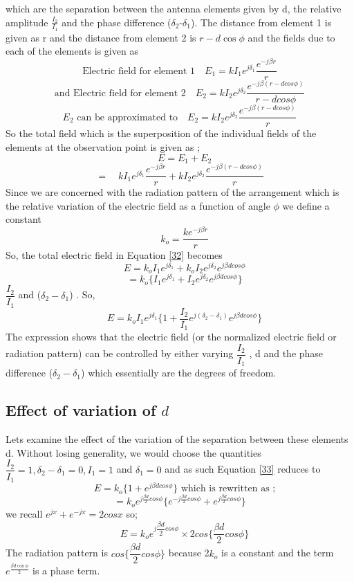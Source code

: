 which are the separation between the antenna elements given by d, the relative amplitude $\frac{I_2}{I_1}$ and the phase difference ($\delta_2$-$\delta_1$). The distance from element 1 is given as r and the distance from element 2 is $r-d\cos\phi$ and the fields due to each of the elements is given as 
$$
\text{Electric field for element 1} \quad E_1 = k I_{1} e^{j\delta_1}  \dfrac{e^{-j\beta r}}{r}  
$$ 
$$
\text{and Electric field for element 2} \quad E_2 =k I_{2} e^{j\delta_2} \dfrac{e^{-j\beta(r-dcos\phi)}}{r-dcos\phi}%
$$
$$
\text{$E_2$ can be approximated to} \quad E_2 = k I_{2}
e^{j\delta_2} \dfrac{e^{-j\beta(r-dcos\phi)}}{r}  %
$$
So the total field which is the superposition of the individual fields of the elements at the observation point is given as ;
$$
\quad E = E_1 + E_2
$$           
\begin{equation}
\label{32}                   
=  \quad k I_{1} e^{j\delta_1}\dfrac{e^{-j\beta r}}{r} + k I_{2} e^{j\delta_2} \dfrac{e^{-j\beta(r-dcos\phi)}}{r} %
\end{equation}
Since we are concerned with the radiation pattern of the arrangement which is the relative variation of the electric field as a function of angle $\phi$ we define a constant   
$$
\quad k_o =\dfrac{ke^{-j\beta r}}{r}  %
$$
So, the total electric field in Equation \ref{32} becomes 
$$
\quad E = k_o I_1e^{j\delta_1} + k_o I_2e^{j\delta_2} e^{j\beta dcos\phi}
$$
$$
\quad = k_o \{I_1 e^{j\delta_1} + I_2 e^{j\delta_2} e^{j\beta dcos\phi}\}
$$
\quad $\dfrac{I_2}{I_1}$  {and}  ($\delta_2 - \delta_1$) . So, 
\begin{equation}
\label{33}
\quad E = k_o I_1 e^{j\delta_1} \{1 + \dfrac{I_2}{I_1} e^{j (\delta_2 - \delta_1)} e^{j\beta dcos\phi}\}
\end{equation} 
The expression shows that the electric field (or the normalized electric field or radiation pattern) can be controlled by either varying $\dfrac{I_2}{I_1}$ , d and the phase difference ($\delta_2 - \delta_1$) which essentially are the degrees of freedom.
\subsection{Effect of variation of $d$}
Lets examine the effect of the variation of the separation between these elements d. Without losing generality, we would choose the quantities $\dfrac{I_2}{I_1} = 1, \delta_2 - \delta_1 = 0 , I_1 =1 $ and $\delta_1 = 0 $ and as such Equation \ref{33} reduces to
$$
\quad E = k_o \{1 + e^{j\beta dcos\phi}\}  \text{ which is rewritten as ;} 
$$
$$
= k_o e^{j\frac{\beta d}{2} cos\phi} \{e^{-j\frac{\beta d}{2} cos\phi} + e^{j\frac{\beta d}{2} cos\phi}\} 
$$ 
we recall $ e^{jx} + e^{-jx} = 2cosx $ so;
\begin{equation}
\quad E = k_o  e^{j\dfrac{\beta d}{2} cos\phi} \times 2 cos \{\dfrac{\beta d}{2} cos\phi\}   
\end{equation} 
The radiation pattern is $ cos\{\dfrac{\beta d}{2} cos\phi\} $ because 2$k_o $ is a constant and the term $e^{\frac{\beta d\cos\phi}{2}}$ is a phase term. 

